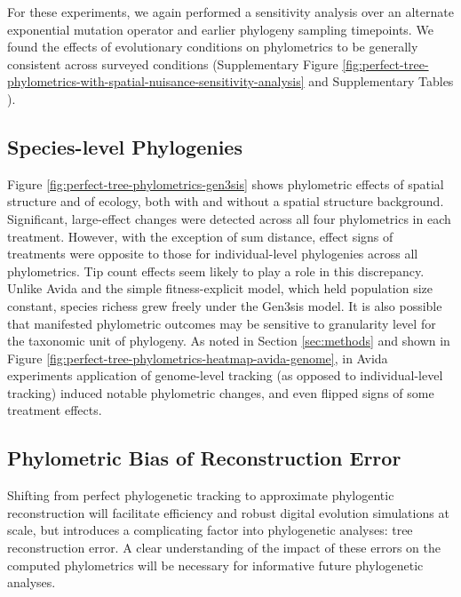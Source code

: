 For these experiments, we again performed a sensitivity analysis over an alternate exponential mutation operator and earlier phylogeny sampling timepoints.
We found the effects of evolutionary conditions on phylometrics to be generally consistent across surveyed conditions (Supplementary Figure \ref{fig:perfect-tree-phylometrics-with-spatial-nuisance-sensitivity-analysis} and Supplementary Tables ).

\subsection{Species-level Phylogenies}




Figure \ref{fig:perfect-tree-phylometrics-gen3sis} shows phylometric effects of spatial structure and of ecology, both with and without a spatial structure background.
Significant, large-effect changes were detected across all four phylometrics in each treatment.
However, with the exception of sum distance, effect signs of treatments were opposite to those for individual-level phylogenies across all phylometrics.
Tip count effects seem likely to play a role in this discrepancy.
Unlike Avida and the simple fitness-explicit model, which held population size constant, species richess grew freely under the Gen3sis model.
It is also possible that manifested phylometric outcomes may be sensitive to granularity level for the taxonomic unit of phylogeny.
As noted in Section \ref{sec:methods} and shown in Figure \ref{fig:perfect-tree-phylometrics-heatmap-avida-genome}, in Avida experiments application of genome-level tracking (as opposed to individual-level tracking) induced notable phylometric changes, and even flipped signs of some treatment effects.

\subsection{Phylometric Bias of Reconstruction Error}
\label{sec:phylometric-bias-reconstruction-error}

Shifting from perfect phylogenetic tracking to approximate phylogentic reconstruction will facilitate efficiency and robust digital evolution simulations at scale, but introduces a complicating factor into phylogenetic analyses: tree reconstruction error.
A clear understanding of the impact of these errors on the computed phylometrics will be necessary for informative future phylogenetic analyses.


